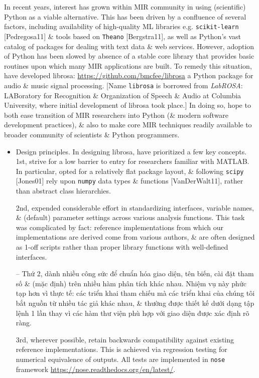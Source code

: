 \documentclass{article}
\begin{document}
\begin{itemize}
	In recent years, interest has grown within MIR community in using (scientific) Python as a viable alternative. This has been driven by a confluence of several factors, including availability of high-quality ML libraries e.g. {\tt scikit-learn} [Pedregosa11] \& tools based on {\tt Theano} [Bergstra11], as well as Python's vast catalog of packages for dealing with text data \& web services. However, adoption of Python has been slowed by absence of a stable core library that provides basic routines upon which many MIR applications are built. To remedy this situation, have developed librosa: \url{https://github.com/bmcfee/librosa} a Python package for audio \& music signal processing. [Name {\tt librosa} is borrowed from {\it LabROSA}: LABoratory for Recognition \& Organization of Speech \& Audio at Columbia University, where initial development of librosa took place.] In doing so, hope to both ease transition of MIR researchers into Python (\& modern software development practices), \& also to make core MIR techniques readily available to broader community of scientists \& Python programmers.
	\begin{itemize}
		\item {\sf Design principles.} In designing librosa, have prioritized a few key concepts. 1st, strive for a low barrier to entry for researchers familiar with MATLAB. In particular, opted for a relatively flat package layout, \& following {\tt scipy} [Jones01] rely upon {\tt numpy} data types \& functions [VanDerWalt11], rather than abstract class hierarchies.
		
		2nd, expended considerable effort in standardizing interfaces, variable names, \& (default) parameter settings across various analysis functions. This task was complicated by fact: reference implementations from which our implementations are derived come from various authors, \& are often designed as 1-off scripts rather than proper library functions with well-defined interfaces.
		
		-- Thứ 2, dành nhiều công sức để chuẩn hóa giao diện, tên biến, cài đặt tham số \& (mặc định) trên nhiều hàm phân tích khác nhau. Nhiệm vụ này phức tạp hơn vì thực tế: các triển khai tham chiếu mà các triển khai của chúng tôi bắt nguồn từ nhiều tác giả khác nhau, \& thường được thiết kế dưới dạng tập lệnh 1 lần thay vì các hàm thư viện phù hợp với giao diện được xác định rõ ràng.
		
		3rd, wherever possible, retain backwards compatibility against existing reference implementations. This is achieved via regression testing for numerical equivalence of outputs. All tests are implemented in {\tt nose} framework \url{https://nose.readthedocs.org/en/latest/}.
		

\end{itemize}
\end{itemize}
\end{document}
